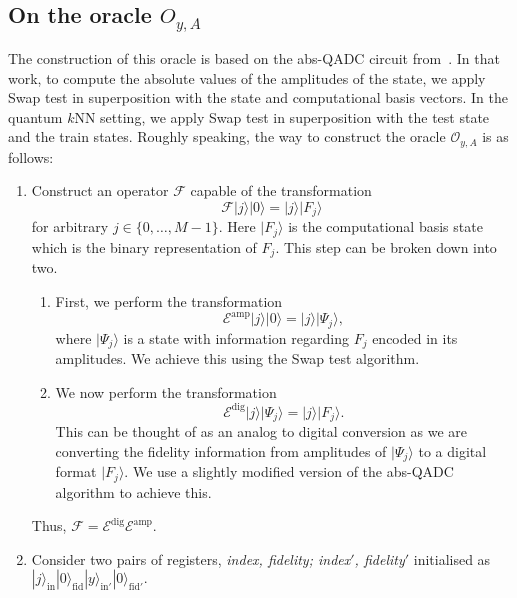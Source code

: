 \documentclass[a4paper,twocolumn,11pt,unpublished]{quantumarticle}
\newcommand{\rang}{\rangle}
\begin{document}
    \subsection{On the oracle $O_{y,A}$}
    The construction of this oracle is based on the abs-QADC circuit from~\cite{Mitarai2019}. In that work, to compute the absolute values of the amplitudes of the state, we apply Swap test in superposition with the state and computational basis vectors. In the quantum $k$NN setting, we apply Swap test in superposition with the test state and the train states. Roughly speaking, the way to construct the oracle $\mathcal O_{y,A}$ is as follows:
    \begin{enumerate}
        \item \label{briefstep1} Construct an operator $\mathcal F$ capable of the transformation
            \begin{equation} \label{F_j_oper}
                \mathcal F |j\rang |0 \rang =  |j \rang |F_j\rang
            \end{equation} 
        for arbitrary $j \in \{0,\ldots,M-1\}$. Here $|F_j\rang$ is the computational basis state which is the binary representation of $F_j$. This step can be broken down into two. 
        
        \begin{enumerate}
            \item First, we perform the transformation 
                \begin{equation}\label{e_amp}
                    \mathcal{E}^\text{amp}|j\rang |0\rang = |j\rang |\Psi_j\rang,
                \end{equation} 
            where $|\Psi_j\rang$ is a state with information regarding $F_j$ encoded in its amplitudes. We achieve this using the Swap test algorithm.
            \item We now perform the transformation
                \begin{equation} \label{e_dig}
                    \mathcal{E}^\text{dig}|j\rang |\Psi_j\rang = |j\rang |F_j\rang.
                \end{equation}
            This can be thought of as an analog to digital conversion as we are converting the fidelity information from amplitudes of $|\Psi_j\rang$ to a digital format $|F_j\rang$. We use a slightly modified version of the abs-QADC algorithm to achieve this.
            \end{enumerate}
        Thus, $\mathcal{F} = \mathcal{E}^\text{dig} \mathcal{E}^\text{amp}$.
        \item Consider two pairs of registers, \emph{index, fidelity; index$'$, fidelity$'$} initialised as $|j\rang_{\text{in}} |0\rang_{\text{fid}} |y\rang_{\text{in$'$}} |0\rang_{\text{fid$'$}}.$    
        

\end{enumerate}
\end{document}
